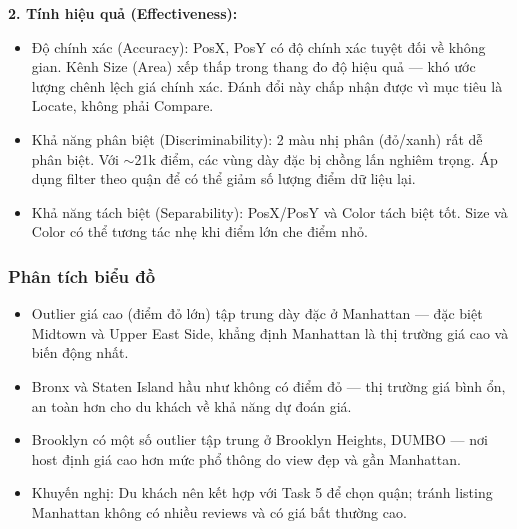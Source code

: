 \textbf{2. Tính hiệu quả (Effectiveness):}

\begin{itemize}
    \item Độ chính xác (Accuracy): PosX, PosY có độ chính xác tuyệt đối về không gian. Kênh Size (Area) xếp thấp trong thang đo độ hiệu quả --- khó ước lượng chênh lệch giá chính xác. Đánh đổi này chấp nhận được vì mục tiêu là Locate, không phải Compare.
    \item Khả năng phân biệt (Discriminability): 2 màu nhị phân (đỏ/xanh) rất dễ phân biệt. Với $\sim$21k điểm, các vùng dày đặc bị chồng lấn nghiêm trọng. Áp dụng filter theo quận để có thể giảm số lượng điểm dữ liệu lại.
    \item Khả năng tách biệt (Separability): PosX/PosY và Color tách biệt tốt. Size và Color có thể tương tác nhẹ khi điểm lớn che điểm nhỏ.
\end{itemize}

\subsubsection{Phân tích biểu đồ}

\begin{itemize}
    \item Outlier giá cao (điểm đỏ lớn) tập trung dày đặc ở Manhattan --- đặc biệt Midtown và Upper East Side, khẳng định Manhattan là thị trường giá cao và biến động nhất.
    \item Bronx và Staten Island hầu như không có điểm đỏ --- thị trường giá bình ổn, an toàn hơn cho du khách về khả năng dự đoán giá.
    \item Brooklyn có một số outlier tập trung ở Brooklyn Heights, DUMBO --- nơi host định giá cao hơn mức phổ thông do view đẹp và gần Manhattan.
    \item Khuyến nghị: Du khách nên kết hợp với Task 5 để chọn quận; tránh listing Manhattan không có nhiều reviews và có giá bất thường cao.
\end{itemize}
